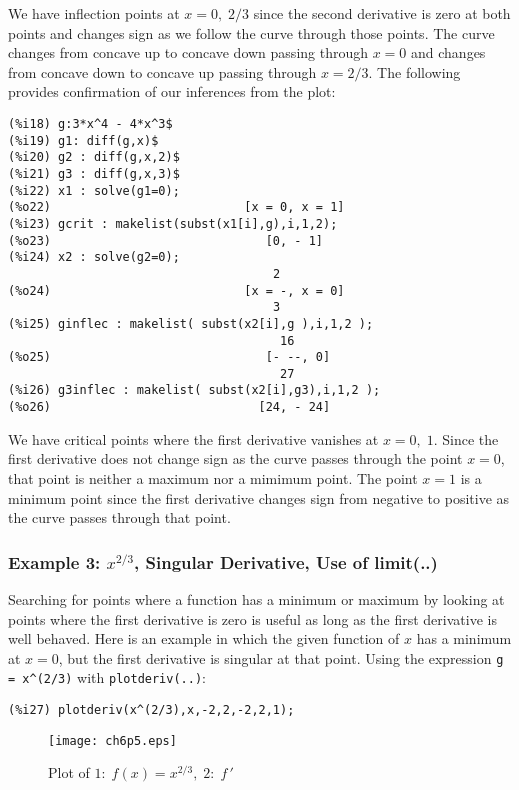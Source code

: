 \documentclass[12pt]{article}
\begin{document}
\smallskip
We have inflection points at $x = 0, \; 2/3$ since the second derivative is zero at
  both points and changes sign as we follow the curve through those points.
The curve changes from concave up to concave down passing through $x = 0$
  and changes from concave down to concave up passing through $x = 2/3$.
The following provides confirmation of our inferences from the plot:
\small
\begin{verbatim}
(%i18) g:3*x^4 - 4*x^3$
(%i19) g1: diff(g,x)$
(%i20) g2 : diff(g,x,2)$
(%i21) g3 : diff(g,x,3)$
(%i22) x1 : solve(g1=0);
(%o22)                           [x = 0, x = 1]
(%i23) gcrit : makelist(subst(x1[i],g),i,1,2);
(%o23)                              [0, - 1]
(%i24) x2 : solve(g2=0);
                                     2
(%o24)                           [x = -, x = 0]
                                     3
(%i25) ginflec : makelist( subst(x2[i],g ),i,1,2 );
                                      16
(%o25)                              [- --, 0]
                                      27
(%i26) g3inflec : makelist( subst(x2[i],g3),i,1,2 );
(%o26)                             [24, - 24]
\end{verbatim}
\normalsize
We have critical points where the first derivative vanishes at $x = 0, \; 1$.
Since the first derivative does not change sign as the curve passes through
  the point $x = 0$, that point is neither a maximum nor a mimimum point.
The point $x = 1$ is a minimum point since the first derivative changes sign
  from negative to positive as the curve passes through that point.


\subsubsection{Example 3: $x^{2/3}$, \;  Singular Derivative, \; Use of limit(..)}
Searching for points where a function has a minimum or maximum by looking at
  points where the first derivative is zero is useful as long as the first
  derivative is well behaved.
Here is an example in which the given function of $x$ has a minimum at $x=0$,
  but the first derivative is singular at that point.
Using the expression \verb|g = x^(2/3)| with \verb|plotderiv(..)|:
\small
\begin{verbatim}
(%i27) plotderiv(x^(2/3),x,-2,2,-2,2,1);									
\end{verbatim}
\normalsize

\begin{figure} [h]
   \centerline{\texttt{[image: ch6p5.eps]} }
	\caption{ Plot of $1:\;f(x) = x^{2/3},\;2:\;f\,'$ }
\end{figure}               
\end{document}
